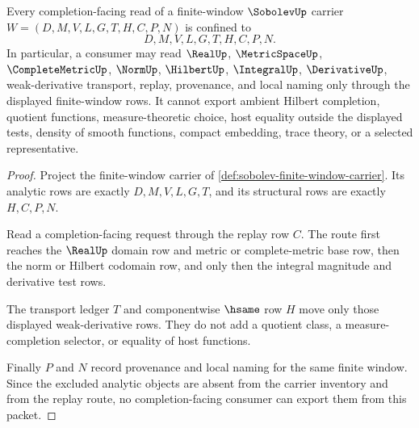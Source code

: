 \begin{theorem}
\label{thm:sobolev-completion-boundary-nonescape}
Every completion-facing read of a finite-window $\SobolevUp$ carrier $W=(D,M,V,L,G,T,H,C,P,N)$ is confined to
$$
D,M,V,L,G,T,H,C,P,N .
$$
In particular, a consumer may read $\RealUp$, $\MetricSpaceUp$, $\CompleteMetricUp$, $\NormUp$, $\HilbertUp$, $\IntegralUp$, $\DerivativeUp$, weak-derivative transport, replay, provenance, and local naming only through the displayed finite-window rows. It cannot export ambient Hilbert completion, quotient functions, measure-theoretic choice, host equality outside the displayed tests, density of smooth functions, compact embedding, trace theory, or a selected representative.
\end{theorem}
\begin{proof}
Project the finite-window carrier of \autoref{def:sobolev-finite-window-carrier}. Its analytic rows are exactly $D,M,V,L,G,T$, and its structural rows are exactly $H,C,P,N$.

Read a completion-facing request through the replay row $C$. The route first reaches the $\RealUp$ domain row and metric or complete-metric base row, then the norm or Hilbert codomain row, and only then the integral magnitude and derivative test rows.

The transport ledger $T$ and componentwise $\hsame$ row $H$ move only those displayed weak-derivative rows. They do not add a quotient class, a measure-completion selector, or equality of host functions.

Finally $P$ and $N$ record provenance and local naming for the same finite window. Since the excluded analytic objects are absent from the carrier inventory and from the replay route, no completion-facing consumer can export them from this packet.
\end{proof}

